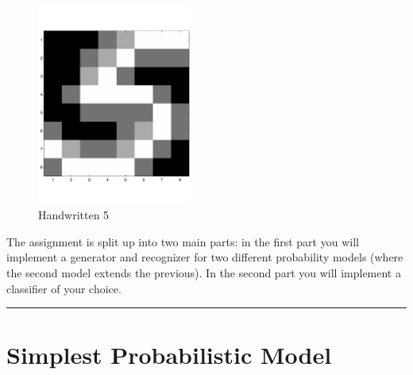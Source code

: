 \documentclass[12pt]{article}
\begin{document}
\bigskip

\hspace*{1.5cm}

\begin{figure}[bt]
\centering
\caption{Handwritten 5}
\label{fig:five}
\includegraphics[width=2in]{images/five.pdf}
\end{figure}

The assignment is split up into two main parts: in the first part
you will implement a generator and recognizer for two different
probability models (where the second model extends the previous).
In the second part you will implement a classifier of your choice.

\newpage

\hrule

\section{Simplest Probabilistic Model}
\label{sec:prob1}
\end{document}
